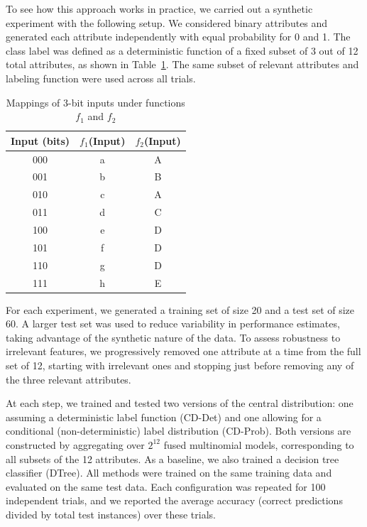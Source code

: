 To see how this approach works in practice, we carried out a synthetic experiment with the following setup.
We considered binary attributes and generated each attribute independently with equal probability for 0 and 1.
The class label was defined as a deterministic function of a fixed subset of 3 out of 12 total attributes, as
shown in Table~\ref{tab:functions}.
The same subset of relevant attributes and labeling function were used across all trials.

\begin{table}[htbp]
    \centering
    \caption{Mappings of 3-bit inputs under functions $f_1$ and $f_2$}
    \begin{tabular}{ccc}
        \toprule
        Input (bits) & $f_1$(Input) & $f_2$(Input) \\
        \midrule
        000          & a            & A            \\
        001          & b            & B            \\
        010          & c            & A            \\
        011          & d            & C            \\
        100          & e            & D            \\
        101          & f            & D            \\
        110          & g            & D            \\
        111          & h            & E            \\
        \bottomrule
    \end{tabular}\label{tab:functions}
\end{table}

For each experiment, we generated a training set of size 20 and a test set of size 60.
A larger test set was used to reduce variability in performance estimates, taking advantage of the synthetic
nature of the data.
To assess robustness to irrelevant features, we progressively removed one attribute at a time from the full set
of 12, starting with irrelevant ones and stopping just before removing any of the three relevant attributes.

At each step, we trained and tested two versions of the central distribution: one assuming a deterministic label
function (CD-Det) and one allowing for a conditional (non-deterministic) label distribution (CD-Prob).
Both versions are constructed by aggregating over $2^{12}$ fused multinomial models, corresponding to all subsets of
the 12 attributes.
As a baseline, we also trained a decision tree classifier (DTree).
All methods were trained on the same training data and evaluated on the same test data.
Each configuration was repeated for 100 independent trials, and we reported the average accuracy (correct
predictions divided by total test instances) over these trials.

